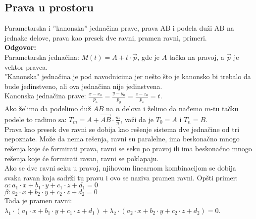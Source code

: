 \documentclass[12pt]{article}
\begin{document}
    \subsection{Prava u prostoru}
    Parametarska i ”kanonska” jednačina prave, prava AB i
    podela duži AB na jednake delove, prava kao presek dve
    ravni, pramen ravni, primeri.
    \\
    \textbf{Odgovor:}\\
    Parametarska jednačina: $M(t)=A+t\cdot\overrightarrow{p}$,
    gde je $A$ tačka na pravoj, a $\overrightarrow{p}$ je vektor
    pravca.\\
    "Kanonska" jednačina je pod navodnicima jer nešto što je kanonsko bi
    trebalo da bude jedinstveno, ali ova jednačina nije jedinstvena.\\
    Kanonska jednačina prave: $\frac{x-x_0}{p_x}=\frac{y-y_0}{p_y}=\frac{z-z_0}{p_z}=t$.\\
    Ako želimo da podelimo duž $AB$ na $n$ delova i
    želimo da nađemo $m$-tu tačku podele to radimo sa:
$T_m=A+\overrightarrow{AB}\cdot\frac{m}{n}$, važi da je
$T_0=A$ i $T_n=B$.\\
    Prava kao presek dve ravni se dobija kao rešenje sistema
    dve jednačine od tri nepoznate. Može da nema rešenja, ravni su paralelne,
    ima beskonačno mnogo rešenja koje će formirati prava, ravni se seku po pravoj ili
    ima beskonačno mnogo rešenja koje će formirati ravan, ravni se poklapaju.\\
    Ako se dve ravni seku u pravoj, njihovom linearnom kombinacijom
    se dobija svaka ravan koja sadrži tu pravu i ovo se naziva
    pramen ravni. Opšti primer:\\
$\alpha: a_1\cdot x+b_1\cdot y+c_1\cdot z+d_1=0$\\
$\beta: a_2\cdot x+b_2\cdot y+c_2\cdot z+d_2=0$\\
    Tada je pramen ravni:\\
$\lambda_1\cdot(a_1\cdot x+b_1\cdot y+c_1\cdot z+d_1)+\lambda_2\cdot (a_2\cdot x+b_2\cdot y+c_2\cdot z+d_2)=0$.
    \par
\end{document}
